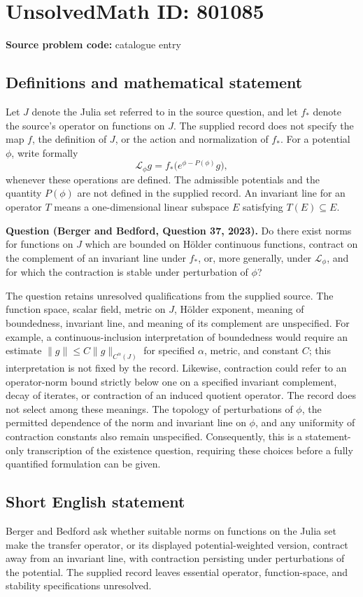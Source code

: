\documentclass[11pt]{article}
\begin{document}
\section*{UnsolvedMath ID: 801085}
\textbf{Source problem code:} catalogue entry
\subsection{Definitions and mathematical statement}
Let \(J\) denote the Julia set referred to in the source question, and let \(f_*\) denote the source's operator on functions on \(J\). The supplied record does not specify the map \(f\), the definition of \(J\), or the action and normalization of \(f_*\). For a potential \(\phi\), write formally
\[
\mathcal L_\phi g=f_*\bigl(e^{\phi-P(\phi)}g\bigr),
\]
whenever these operations are defined. The admissible potentials and the quantity \(P(\phi)\) are not defined in the supplied record. An invariant line for an operator \(T\) means a one-dimensional linear subspace \(E\) satisfying \(T(E)\subseteq E\).

\textbf{Question (Berger and Bedford, Question 37, 2023).} Do there exist norms for functions on \(J\) which are bounded on H\"older continuous functions, contract on the complement of an invariant line under \(f_*\), or, more generally, under \(\mathcal L_\phi\), and for which the contraction is stable under perturbation of \(\phi\)?

The question retains unresolved qualifications from the supplied source. The function space, scalar field, metric on \(J\), H\"older exponent, meaning of boundedness, invariant line, and meaning of its complement are unspecified. For example, a continuous-inclusion interpretation of boundedness would require an estimate \(\|g\|\leq C\|g\|_{C^\alpha(J)}\) for specified \(\alpha\), metric, and constant \(C\); this interpretation is not fixed by the record. Likewise, contraction could refer to an operator-norm bound strictly below one on a specified invariant complement, decay of iterates, or contraction of an induced quotient operator. The record does not select among these meanings. The topology of perturbations of \(\phi\), the permitted dependence of the norm and invariant line on \(\phi\), and any uniformity of contraction constants also remain unspecified. Consequently, this is a statement-only transcription of the existence question, requiring these choices before a fully quantified formulation can be given.
\subsection{Short English statement}
Berger and Bedford ask whether suitable norms on functions on the Julia set make the transfer operator, or its displayed potential-weighted version, contract away from an invariant line, with contraction persisting under perturbations of the potential. The supplied record leaves essential operator, function-space, and stability specifications unresolved.
\end{document}
